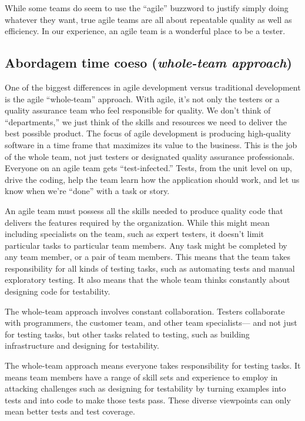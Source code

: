 \documentclass[
	12pt,				%
	openright,			%
	oneside,			%
	a4paper,			%
	english,			%
	brazil,				%
	]{abntex2}
\begin{document}
While some teams do seem to use the “agile” buzzword to justify simply doing whatever they want, true agile teams are all about repeatable quality as well as efficiency. In our experience, an agile team is a wonderful place to be a tester.

\subsection{Abordagem time coeso (\emph{whole-team approach})}

One of the biggest differences in agile development versus traditional development is the agile “whole-team” approach. With agile, it’s not only the testers or a quality assurance team who feel responsible for quality. We don’t think of “departments,” we just think of the skills and resources we need to deliver the best possible product. The focus of agile development is producing high-quality software in a time frame that maximizes its value to the business. This is the job of the whole team, not just testers or designated quality assurance professionals. Everyone on an agile team gets “test-infected.” Tests, from the unit level on up, drive the coding, help the team learn how the application should work, and let us know when we’re “done” with a task or story.

An agile team must possess all the skills needed to produce quality code that delivers the features required by the organization. While this might mean including specialists on the team, such as expert testers, it doesn’t limit particular tasks to particular team members. Any task might be completed by any team member, or a pair of team members. This means that the team takes responsibility for all kinds of testing tasks, such as automating tests and manual exploratory testing. It also means that the whole team thinks constantly about designing code for testability.

The whole-team approach involves constant collaboration. Testers collaborate with programmers, the customer team, and other team specialists— and not just for testing tasks, but other tasks related to testing, such as building infrastructure and designing for testability.

The whole-team approach means everyone takes responsibility for testing tasks. It means team members have a range of skill sets and experience to employ in attacking challenges such as designing for testability by turning examples into tests and into code to make those tests pass. These diverse viewpoints can only mean better tests and test coverage.
\end{document}
